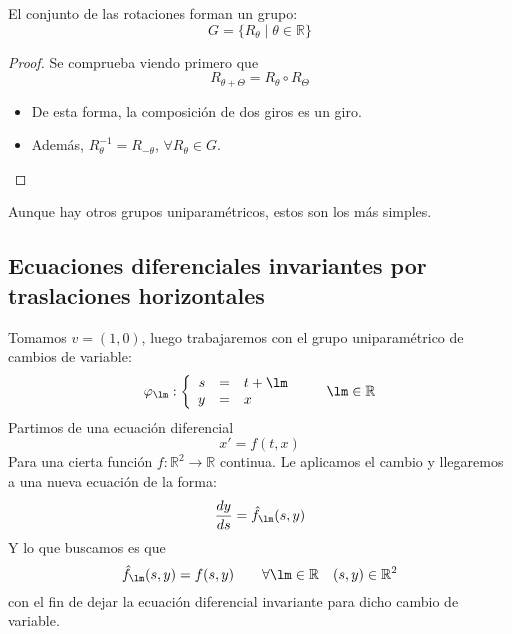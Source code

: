 \begin{prop}
El conjunto de las rotaciones forman un grupo:    
\begin{equation*}
    G = \{R_\theta \mid \theta \in \mathbb{R}\}
\end{equation*}
\begin{proof}
    Se comprueba viendo primero que    
    \begin{equation*}
        R_{\theta + \Theta} = R_\theta \circ R_\Theta        
    \end{equation*}
    \begin{itemize}
        \item De esta forma, la composición de dos giros es un giro.
        \item Además, $R_\theta^{-1} = R_{-\theta}$, $\forall R_\theta \in G$.
    \end{itemize}
\end{proof}
\end{prop}

Aunque hay otros grupos uniparamétricos, estos son los más simples.

\subsection{Ecuaciones diferenciales invariantes por traslaciones horizontales}
\noindent
Tomamos $v = (1,0)$, luego trabajaremos con el grupo uniparamétrico de cambios de variable:
\begin{equation*}
    \varphi_\lm: \left\{\begin{array}{rcl}
            s &= &t + \lm \\
            y &= &x
    \end{array}\right. \qquad \lm \in \mathbb{R}
\end{equation*}
Partimos de una ecuación diferencial
\begin{equation*}
    x' = f(t,x)
\end{equation*}
Para una cierta función $f:\mathbb{R}^2 \rightarrow \mathbb{R}$ continua. Le aplicamos el cambio y llegaremos a una nueva ecuación de la forma:
\begin{equation*}
    \dfrac{dy}{ds} = \hat{f}_\lm(s,y)
\end{equation*}
Y lo que buscamos es que 
\begin{equation*}
     \hat{f}_\lm(s,y) = f(s,y) \qquad \forall \lm \in \mathbb{R} \quad (s,y)\in \mathbb{R}^2
\end{equation*}
con el fin de dejar la ecuación diferencial invariante para dicho cambio de variable.\\


